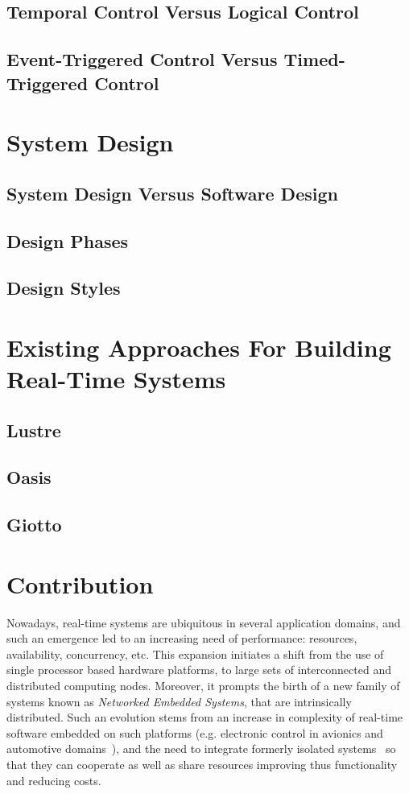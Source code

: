 \subsection{Temporal Control Versus Logical Control}
\subsection{Event-Triggered Control Versus Timed-Triggered Control}

\section{System Design}
\subsection{System Design Versus Software Design}
\subsection{Design Phases}
\subsection{Design Styles}

\section{Existing Approaches For Building Real-Time Systems}

\subsection{Lustre}
\subsection{Oasis}
\subsection{Giotto}
\section{Contribution}

Nowadays, real-time systems are ubiquitous in several application domains, 
and such an emergence led to an increasing need of performance: resources, 
availability, concurrency, etc. This expansion initiates a shift from the
use of single processor based hardware platforms, to large sets 
of interconnected and distributed computing nodes. Moreover, it prompts the birth 
of a new family of systems known as \emph{Networked Embedded Systems}, 
that are intrinsically distributed.
Such an evolution stems from an increase in complexity of real-time software 
embedded on such platforms (e.g. electronic control in avionics 
and automotive domains~\cite{charette09}), and the need to integrate 
formerly isolated systems~\cite{kopetz04} so that 
they can cooperate as well as share resources improving thus functionality 
and reducing costs.

